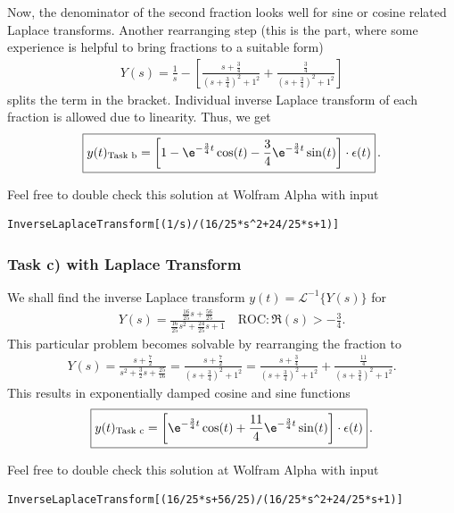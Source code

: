 Now, the denominator of the second fraction looks well for sine or cosine related
Laplace transforms.
Another rearranging step (this is the part, where some experience
is helpful to bring fractions to a suitable form)
\begin{align}
Y(s) =
\frac{1}{s} - \left[\frac{s + \frac{3}{4}}{(s + \frac{3}{4})^2 + 1^2} +
\frac{\frac{3}{4}}{(s+\frac{3}{4})^2 + 1^2}\right]
\end{align}
splits the term in the bracket.
Individual inverse Laplace transform of each fraction is allowed due to
linearity. Thus, we get
\begin{align}
\label{eq:stepResponse_Laplace}
\boxed{y(t)_\text{Task b} =
\left[1
- \e^{-\frac{3}{4} t} \cos(t)
- \frac{3}{4}\e^{-\frac{3}{4} t} \sin(t) \right] \cdot \epsilon(t)}\,.
\end{align}

Feel free to double check this solution at Wolfram Alpha with input
\begin{verbatim}
InverseLaplaceTransform[(1/s)/(16/25*s^2+24/25*s+1)]
\end{verbatim}

\subsubsection{Task c) with Laplace Transform}
We shall find the inverse Laplace transform $y(t) = \mathcal{L}^{-1}\{Y(s)\}$
for
\begin{align}
Y(s) =
\frac{\frac{16}{25} s + \frac{56}{25}}{\frac{16}{25} s^2 + \frac{24}{25} s + 1}
\quad \text{ROC}: \Re(s) > -\frac{3}{4}.
\end{align}
This particular problem becomes solvable by rearranging the fraction to
\begin{align}
Y(s) =
\frac{s + \frac{7}{2}}{s^2 + \frac{3}{2} s + \frac{25}{16}} =
\frac{s + \frac{7}{2}}{(s + \frac{3}{4})^2 + 1^2}
=\frac{s + \frac{3}{4}}{(s + \frac{3}{4})^2 + 1^2}
+\frac{\frac{11}{4}}{(s + \frac{3}{4})^2 + 1^2}.
\end{align}
This results in exponentially damped cosine and sine functions
\begin{align}
\boxed{y(t)_\text{Task c} =
\left[\e^{-\frac{3}{4} t} \cos(t)
+\frac{11}{4}\e^{-\frac{3}{4} t} \sin(t) \right] \cdot \epsilon(t)}\,.
\end{align}

Feel free to double check this solution at Wolfram Alpha with input
\begin{verbatim}
InverseLaplaceTransform[(16/25*s+56/25)/(16/25*s^2+24/25*s+1)]
\end{verbatim}


